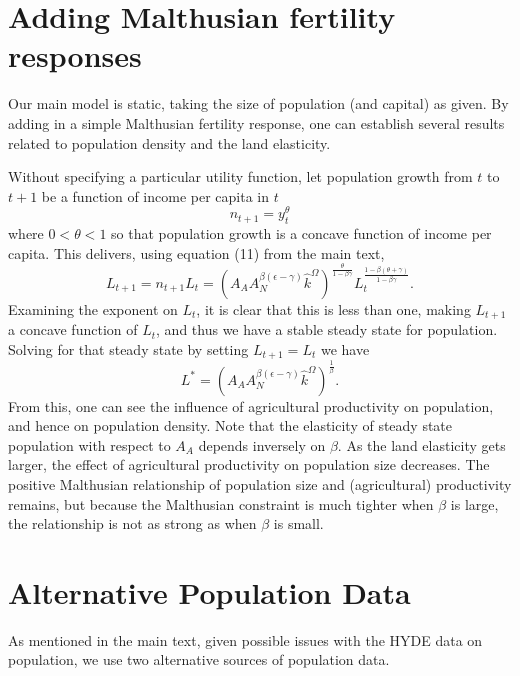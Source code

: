 \documentclass[11pt]{article}
\begin{document}
\section{Adding Malthusian fertility responses}
Our main model is static, taking the size of population (and capital) as given. By adding in a simple Malthusian fertility response, one can establish several results related to population density and the land elasticity. 

Without specifying a particular utility function, let population growth from $t$ to $t+1$ be a function of income per capita in $t$
\begin{equation}
    n_{t+1} = y_t^{\theta}
\end{equation}
where $0<\theta<1$ so that population growth is a concave function of income per capita. This delivers, using equation (11) from the main text, 
\begin{equation}
    L_{t+1} = n_{t+1} L_t = \left(A_A A_N^{\beta(\epsilon-\gamma)}\hat{k}^{\Omega}\right)^{\frac{\theta}{1-\beta\gamma}} L_t^{\frac{1-\beta(\theta+\gamma)}{1-\beta\gamma}}.
\end{equation}
Examining the exponent on $L_t$, it is clear that this is less than one, making $L_{t+1}$ a concave function of $L_t$, and thus we have a stable steady state for population. Solving for that steady state by setting $L_{t+1} = L_t$ we have
\begin{equation}
    L^{\ast} = \left(A_A A_N^{\beta(\epsilon-\gamma)}\hat{k}^{\Omega}\right)^{\frac{1}{\beta}}.
\end{equation}
From this, one can see the influence of agricultural productivity on population, and hence on population density. Note that the elasticity of steady state population with respect to $A_A$ depends inversely on $\beta$. As the land elasticity gets larger, the effect of agricultural productivity on population size decreases. The positive Malthusian relationship of population size and (agricultural) productivity remains, but because the Malthusian constraint is much tighter when $\beta$ is large, the relationship is not as strong as when $\beta$ is small. 

\section{Alternative Population Data}
As mentioned in the main text, given possible issues with the HYDE data on population, we use two alternative sources of population data.
\end{document}
